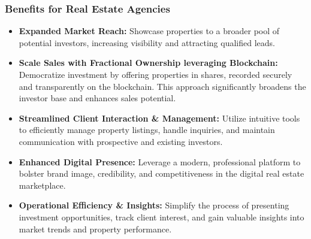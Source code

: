 \subsubsection*{Benefits for Real Estate Agencies}
\begin{itemize}
    \item \textbf{Expanded Market Reach:} Showcase properties to a broader pool of potential investors, increasing visibility and attracting qualified leads.
    \item \textbf{Scale Sales with Fractional Ownership leveraging Blockchain:} Democratize investment by offering properties in shares, recorded securely and transparently on the blockchain. This approach significantly broadens the investor base and enhances sales potential.
    \item \textbf{Streamlined Client Interaction \& Management:} Utilize intuitive tools to efficiently manage property listings, handle inquiries, and maintain communication with prospective and existing investors.
    \item \textbf{Enhanced Digital Presence:} Leverage a modern, professional platform to bolster brand image, credibility, and competitiveness in the digital real estate marketplace.
    \item \textbf{Operational Efficiency \& Insights:} Simplify the process of presenting investment opportunities, track client interest, and gain valuable insights into market trends and property performance.
\end{itemize}

